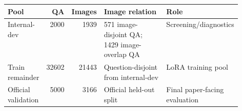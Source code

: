 \begin{tabular}{lrrp{0.31\linewidth}p{0.22\linewidth}}
\toprule
Pool & QA & Images & Image relation & Role\\
\midrule
Internal-dev & 2000 & 1939 & 571 image-disjoint QA; 1429 image-overlap QA & Screening/diagnostics\\
Train remainder & 32602 & 21443 & Question-disjoint from internal-dev & LoRA training pool\\
Official validation & 5000 & 3166 & Official held-out split & Final paper-facing evaluation\\
\bottomrule
\end{tabular}
